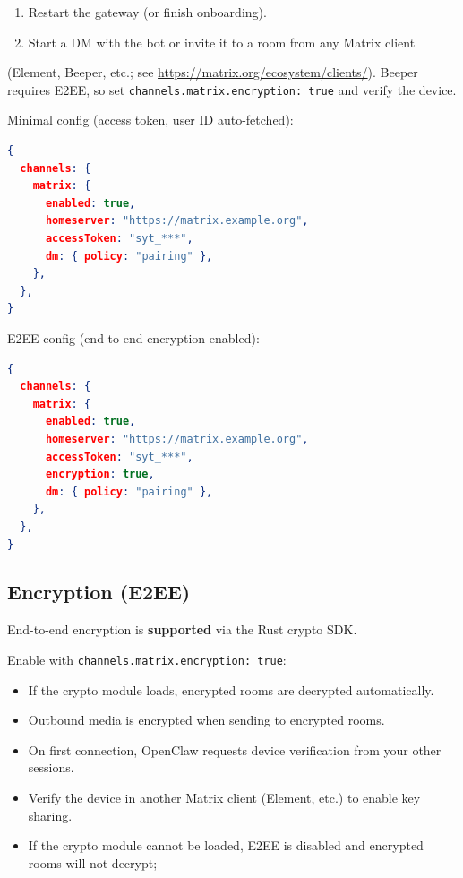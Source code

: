 \begin{enumerate}
  \item Restart the gateway (or finish onboarding).
  \item Start a DM with the bot or invite it to a room from any Matrix client
\end{enumerate}

(Element, Beeper, etc.; see \href{https://matrix.org/ecosystem/clients/}{https://matrix.org/ecosystem/clients/}). Beeper requires E2EE,
so set \texttt{channels.matrix.encryption: true} and verify the device.

Minimal config (access token, user ID auto-fetched):

\begin{lstlisting}[language=json]
{
  channels: {
    matrix: {
      enabled: true,
      homeserver: "https://matrix.example.org",
      accessToken: "syt_***",
      dm: { policy: "pairing" },
    },
  },
}
\end{lstlisting}


E2EE config (end to end encryption enabled):

\begin{lstlisting}[language=json]
{
  channels: {
    matrix: {
      enabled: true,
      homeserver: "https://matrix.example.org",
      accessToken: "syt_***",
      encryption: true,
      dm: { policy: "pairing" },
    },
  },
}
\end{lstlisting}


\subsection{Encryption (E2EE)}


End-to-end encryption is \textbf{supported} via the Rust crypto SDK.

Enable with \texttt{channels.matrix.encryption: true}:

\begin{itemize}
  \item If the crypto module loads, encrypted rooms are decrypted automatically.
  \item Outbound media is encrypted when sending to encrypted rooms.
  \item On first connection, OpenClaw requests device verification from your other sessions.
  \item Verify the device in another Matrix client (Element, etc.) to enable key sharing.
  \item If the crypto module cannot be loaded, E2EE is disabled and encrypted rooms will not decrypt;
\end{itemize}

